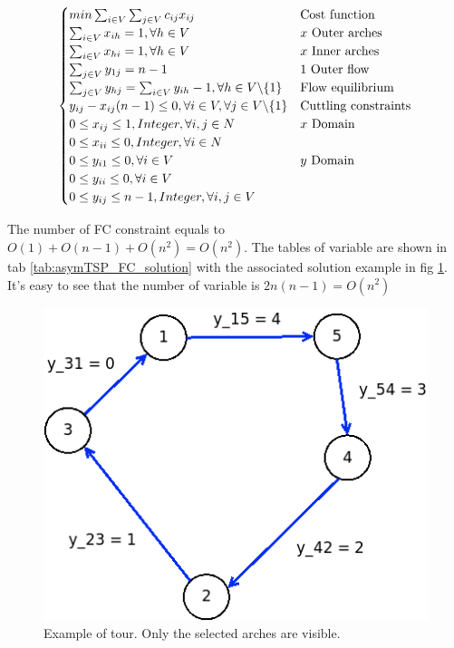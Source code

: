 \begin{equation}
\begin{cases}
min \sum_{i\in V}\sum_{j\in V} c_{ij}x_{ij}  & \text{Cost function} \\
\sum_{i\in V} x_{ih} = 1, \forall h \in V  & \text{$ x $ Outer arches} \\
\sum_{i\in V} x_{hi} = 1, \forall h \in V  & \text{$ x $ Inner arches} \\
\sum_{j\in V} y_{1j} = n-1  & \text{$ 1 $ Outer flow} \\
\sum_{j\in V} y_{hj} = \sum_{i \in V}y_{ih} - 1, \forall h \in V \backslash \{1\}  & \text{Flow equilibrium} \\
y_{ij} - x_{ij}(n-1) \le 0, \forall i \in V, \forall j \in V \backslash \{1\}  & \text{Cuttling constraints} \\ %
0 \le x_{ij} \le 1, Integer, \forall i,j \in N  & \text{$ x $ Domain} \\
0 \le x_{ii} \le 0, Integer, \forall i \in N & \text{} \\
0 \le y_{i1} \le 0, \forall i \in V  & \text{$ y $ Domain} \\
0 \le y_{ii} \le 0, \forall i \in V  & \text{} \\
0 \le y_{ij} \le n-1, Integer, \forall i,j \in V  & \text{} 
\end{cases}
\label{eq:ATSP_FC}
\end{equation}


The number of FC constraint equals to $ O(1) + O(n-1) + O(n^2) = O(n^2) $. The tables of variable are shown in tab \ref{tab:asymTSP_FC_solution} with the associated solution example in fig \ref{fig:asymTSP_FC}. It's easy to see that the number of variable is $ 2n(n-1) = O(n^2) $\\


\begin{figure}[h]
	\centering
	\includegraphics[width=.4\columnwidth]{img/asymTSP_FC_example.png}
	\caption{Example of tour. Only the selected arches are visible.}
	\label{fig:asymTSP_FC}
\end{figure}

